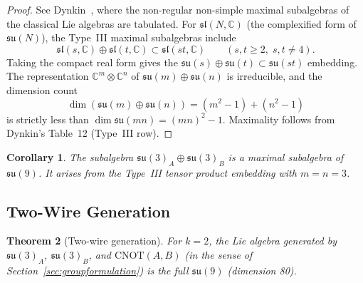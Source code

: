 \documentclass[12pt,a4paper]{article}
\newtheorem{theorem}{Theorem}
\newtheorem{corollary}[theorem]{Corollary}
\begin{document}
\begin{proof}
See Dynkin~\cite[\S15, no.~46, Type~III table (p.~114)]{dynkin1952},
where the non-regular non-simple maximal subalgebras of the classical Lie
algebras are tabulated. For $\mathfrak{sl}(N,\mathbb{C})$ (the complexified
form of $\mathfrak{su}(N)$), the Type~III maximal subalgebras include
\[
\mathfrak{sl}(s,\mathbb{C}) \oplus \mathfrak{sl}(t,\mathbb{C})
\subset \mathfrak{sl}(st,\mathbb{C}) \qquad(s,t \ge 2,\; s,t \neq 4).
\]
Taking the compact real form gives the $\mathfrak{su}(s) \oplus
\mathfrak{su}(t) \subset \mathfrak{su}(st)$ embedding. The representation
$\mathbb{C}^m \otimes \mathbb{C}^n$ of $\mathfrak{su}(m)\oplus\mathfrak{su}(n)$
is irreducible, and the dimension count
\[
\dim(\mathfrak{su}(m)\oplus\mathfrak{su}(n)) = (m^2-1)+(n^2-1)
\]
is strictly less than $\dim\mathfrak{su}(mn) = (mn)^2-1$.
Maximality follows from Dynkin's Table~12 (Type~III row).
\end{proof}

\begin{corollary}
\label{cor:su3su3max}
The subalgebra $\mathfrak{su}(3)_A \oplus \mathfrak{su}(3)_B$ is a maximal
subalgebra of $\mathfrak{su}(9)$. It arises from the Type~III tensor product
embedding with $m=n=3$.
\end{corollary}

\subsection{Two-Wire Generation}

\begin{theorem}[Two-wire generation]
\label{thm:2wire}
For $k=2$, the Lie algebra generated by $\mathfrak{su}(3)_A$,
$\mathfrak{su}(3)_B$, and $\text{CNOT}(A,B)$ (in the sense of
Section~\ref{sec:groupformulation}) is the full $\mathfrak{su}(9)$
(dimension 80).
\end{theorem}
\end{document}
